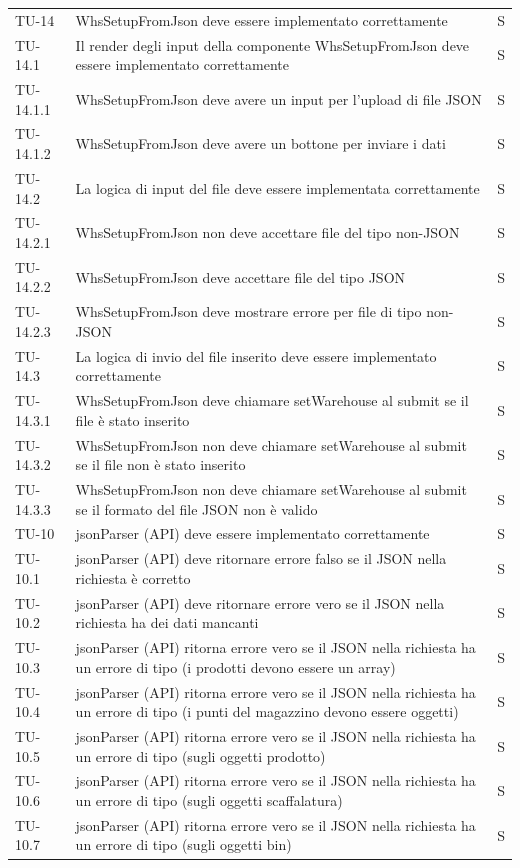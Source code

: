 \begin{xltabular}{0.9\textwidth}{X | p{0.6\textwidth} | p{0.1\textwidth} }
    TU-14 & WhsSetupFromJson deve essere implementato correttamente & S\\
    TU-14.1 & Il render degli input della componente WhsSetupFromJson deve essere implementato correttamente & S\\
    TU-14.1.1 & WhsSetupFromJson deve avere un input per l'upload di file JSON & S\\
    TU-14.1.2 & WhsSetupFromJson deve avere un bottone per inviare i dati & S\\
    TU-14.2 & La logica di input del file deve essere implementata correttamente  & S\\
    TU-14.2.1 & WhsSetupFromJson non deve accettare file del tipo non-JSON & S\\
    TU-14.2.2 & WhsSetupFromJson deve accettare file del tipo JSON & S\\
    TU-14.2.3 & WhsSetupFromJson deve mostrare errore per file di tipo non-JSON & S\\
    TU-14.3 & La logica di invio del file inserito deve essere implementato correttamente  & S\\
    TU-14.3.1 & WhsSetupFromJson deve chiamare setWarehouse al submit se il file è stato inserito & S\\
    TU-14.3.2 & WhsSetupFromJson non deve chiamare setWarehouse al submit se il file non è stato inserito & S\\
    TU-14.3.3 & WhsSetupFromJson non deve chiamare setWarehouse al submit se il formato del file JSON non è valido & S\\

    TU-10 & jsonParser (API) deve essere implementato correttamente & S\\
    TU-10.1 & jsonParser (API) deve ritornare errore falso se il JSON nella richiesta è corretto & S\\
    TU-10.2 & jsonParser (API) deve ritornare errore vero se il JSON nella richiesta ha dei dati mancanti & S\\
    TU-10.3 & jsonParser (API) ritorna errore vero se il JSON nella richiesta ha un errore di tipo (i prodotti devono essere un array) & S\\
    TU-10.4 & jsonParser (API) ritorna errore vero se il JSON nella richiesta ha un errore di tipo (i punti del magazzino devono essere oggetti) & S\\
    TU-10.5 & jsonParser (API) ritorna errore vero se il JSON nella richiesta ha un errore di tipo (sugli oggetti prodotto) & S\\
    TU-10.6 & jsonParser (API) ritorna errore vero se il JSON nella richiesta ha un errore di tipo (sugli oggetti scaffalatura) & S\\
    TU-10.7 & jsonParser (API) ritorna errore vero se il JSON nella richiesta ha un errore di tipo (sugli oggetti bin) & S\\
    

\end{xltabular}
